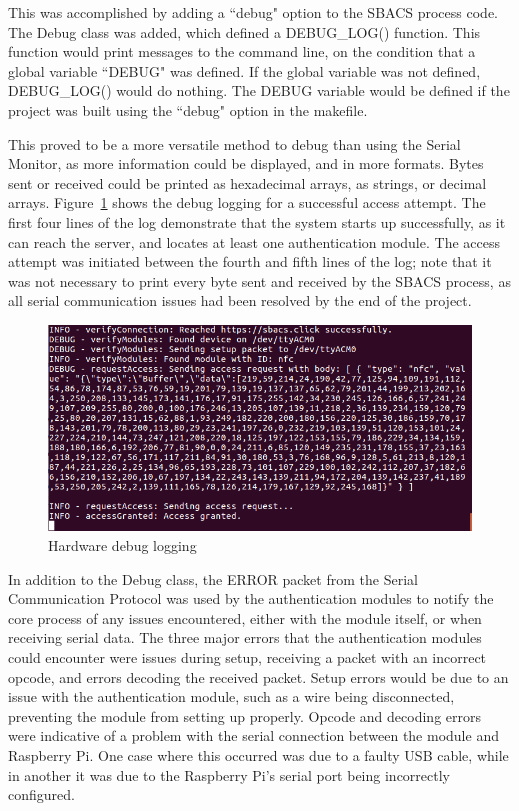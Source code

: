\documentclass[12pt]{report}
\begin{document}
This was accomplished by adding a ``debug" option to the SBACS process code. The Debug class was added, which defined a 
DEBUG\_LOG() function. This function would print messages to the command line, on the condition that a global variable 
``DEBUG" was defined. If the global variable was not defined, DEBUG\_LOG() would do nothing. The DEBUG variable would be 
defined if the project was built using the ``debug" option in the makefile.

This proved to be a more versatile method to debug than using the Serial Monitor, as more information could be 
displayed, and in more formats. Bytes sent or received could be printed as hexadecimal arrays, as strings, or decimal 
arrays. Figure~\ref{fig:hardware-debug-logging} shows the debug logging for a successful access attempt. The first four 
lines of the log demonstrate that the system starts up successfully, as it can reach the server, and locates at least 
one authentication module. The access attempt was initiated between the fourth and fifth lines of the log; note that it 
was not necessary to print every byte sent and received by the SBACS process, as all serial communication issues 
had been resolved by the end of the project.

\begin{figure}
    \includegraphics[width=\textwidth]{Diagrams/Hardware-Diagrams/access_granted}
    \caption{Hardware debug logging}
    \label{fig:hardware-debug-logging}
\end{figure}

In addition to the Debug class, the ERROR packet from the Serial Communication Protocol was used by the authentication 
modules to notify the core process of any issues encountered, either with the module itself, or when receiving serial 
data. The three major errors that the authentication modules could encounter were issues during setup, receiving a 
packet with an incorrect opcode, and errors decoding the received packet. Setup errors would be due to an issue with 
the authentication module, such as a wire being disconnected, preventing the module from setting up properly. Opcode 
and decoding errors were indicative of a problem with the serial connection between the module and Raspberry Pi. One 
case where this occurred was due to a faulty USB cable, while in another it was due to the Raspberry Pi's serial port 
being incorrectly configured.
\end{document}
